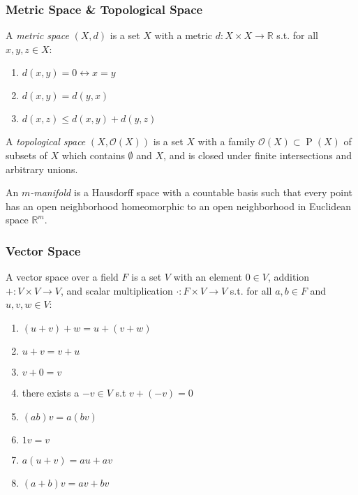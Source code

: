 \documentclass[UTF8,11pt,colorlinks,compress,openany]{beamer}%
\begin{document}
\begin{frame}\frametitle{Metric Space \& Topological Space}
\setlength\abovedisplayskip{0pt}
\setlength\belowdisplayskip{0pt}
\begin{definition}
	A \emph{metric space} $(X,d)$ is a set $X$ with a metric $d:X\times X\to \mathbb{R}$ s.t. for all $x,y,z\in X$:
\begin{enumerate}
	\item $d(x,y)=0\leftrightarrow x=y$
	\item $d(x,y)=d(y,x)$
	\item $d(x,z)\leq d(x,y)+d(y,z)$
\end{enumerate}
\end{definition}
\begin{definition}
	A \emph{topological space} $(X,\mathcal{O}(X))$ is a set $X$ with a family $\mathcal{O}(X)\subset\operatorname{P}(X)$ of subsets of $X$ which contains $\emptyset$ and $X$, and is closed under finite intersections and arbitrary unions.
\end{definition}
\begin{definition}[Manifold]
	An \emph{$m$-manifold} is a Hausdorff space with a countable basis such that every point has an open neighborhood homeomorphic to an open neighborhood in Euclidean space $\mathbb{R}^m$.
\end{definition}
\end{frame}

\begin{frame}\frametitle{Vector Space}
	\begin{definition}
		A vector space over a field $F$ is a set $V$ with an element $0\in V$, addition $+:V\times V\to V$, and scalar multiplication $\cdot:F\times V\to V$ s.t. for all $a,b\in F$ and $u,v,w\in V$:
		\begin{enumerate}
			\item $(u+v)+w=u+(v+w)$
			\item $u+v=v+u$
			\item $v+0=v$
			\item there exists a $-v\in V$ s.t $v+(-v)=0$
			\item $(ab)v=a(bv)$
			\item $1v=v$
			\item $a(u+v)=au+av$
			\item $(a+b)v=av+bv$
		\end{enumerate}
	\end{definition}
\end{frame}
\end{document}

